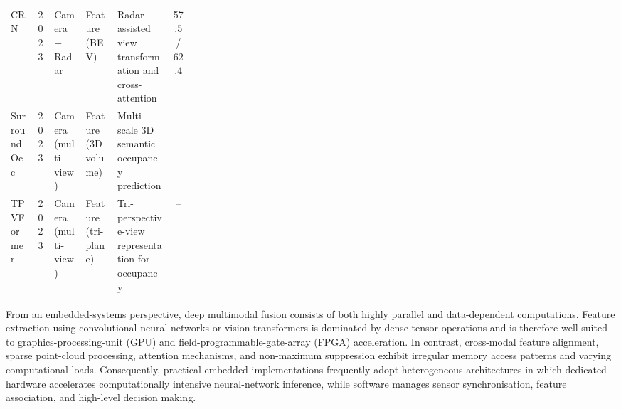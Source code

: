 \documentclass[graybox,envcountchap]{style/SNmono}
\begin{document}
\begin{table}[!t]
\begin{adjustbox}{max width=\textwidth}
\begin{tabular}{l c l l p{0.30\linewidth} c}
        CRN \cite{kim2023_crn} & 2023 & Camera + Radar & Feature (BEV) & Radar-assisted view transformation and cross-attention & 57.5 / 62.4 \\
        SurroundOcc \cite{wei2023_surroundocc} & 2023 & Camera (multi-view) & Feature (3D volume) & Multi-scale 3D semantic occupancy prediction & -- \\
        TPVFormer \cite{huang2023_tpvformer} & 2023 & Camera (multi-view) & Feature (tri-plane) & Tri-perspective-view representation for occupancy & -- \\
        \hline
    \end{tabular}
    \end{adjustbox}
\end{table}


From an embedded-systems perspective, deep multimodal fusion consists of both highly parallel and data-dependent computations. Feature extraction using convolutional neural networks or vision transformers is dominated by dense tensor operations and is therefore well suited to graphics-processing-unit (GPU) and field-programmable-gate-array (FPGA) acceleration. In contrast, cross-modal feature alignment, sparse point-cloud processing, attention mechanisms, and non-maximum suppression exhibit irregular memory access patterns and varying computational loads. Consequently, practical embedded implementations frequently adopt heterogeneous architectures in which dedicated hardware accelerates computationally intensive neural-network inference, while software manages sensor synchronisation, feature association, and high-level decision making.
\end{document}
